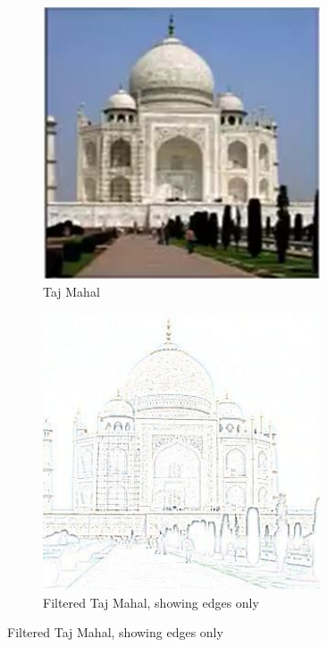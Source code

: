 \documentclass[]{article}
\begin{document}
\begin{figure}[H]
\begin{center}
\begin{subfigure}[t]{0.45\textwidth}
		\end{subfigure}
		\begin{subfigure}[t]{0.45\textwidth}
			\caption{Taj Mahal}\label{fig:rf3}
			\includegraphics[width=0.9\textwidth]{receptive-field3}
		\end{subfigure}
		\begin{subfigure}[t]{0.45\textwidth}
			\caption{Filtered Taj Mahal, showing edges only}\label{fig:rf4}
			\includegraphics[width=0.9\textwidth]{receptive-field4}
		\end{subfigure}
	\end{center}
\end{figure}
\end{document}
